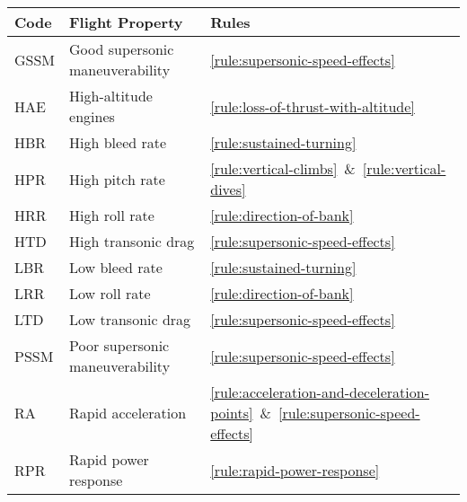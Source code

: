 \begin{twocolumntablefloat}
\begin{twocolumntable}

\begin{tabularx}{0.6\linewidth}{lLl}
\toprule
Code&Flight Property&Rules\\
\midrule
GSSM&Good supersonic maneuverability&\mbox{\ref{rule:supersonic-speed-effects}}\\
HAE&High-altitude engines&\mbox{\ref{rule:loss-of-thrust-with-altitude}}\\
HBR&High bleed rate&\mbox{\ref{rule:sustained-turning}}\\
HPR&High pitch rate&\mbox{\ref{rule:vertical-climbs} \& \ref{rule:vertical-dives}}\\
HRR&High roll rate&\mbox{\ref{rule:direction-of-bank}}\\
HTD&High transonic drag&\mbox{\ref{rule:supersonic-speed-effects}}\\
LBR&Low bleed rate&\mbox{\ref{rule:sustained-turning}}\\
LRR&Low roll rate&\mbox{\ref{rule:direction-of-bank}}\\
LTD&Low transonic drag&\mbox{\ref{rule:supersonic-speed-effects}}\\
PSSM&Poor supersonic maneuverability&\mbox{\ref{rule:supersonic-speed-effects}}\\
RA&Rapid acceleration&\mbox{\ref{rule:acceleration-and-deceleration-points} \& \ref{rule:supersonic-speed-effects}}\\
RPR&Rapid power response&\mbox{\ref{rule:rapid-power-response}}\\
\bottomrule
\end{tabularx}

\end{twocolumntable}
\end{twocolumntablefloat}
